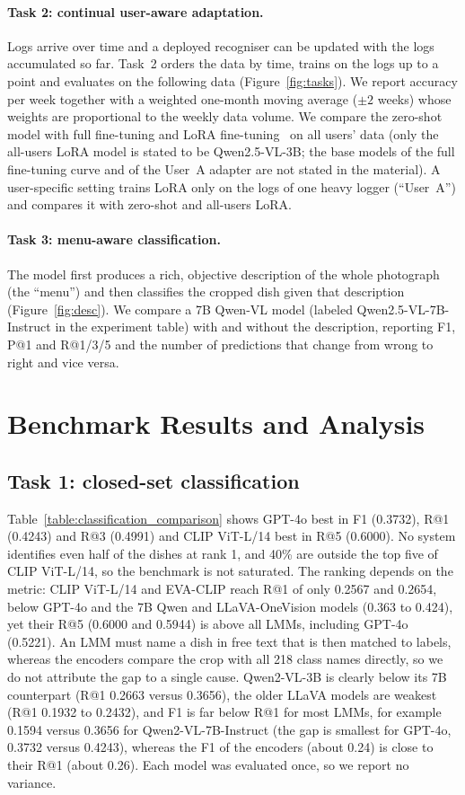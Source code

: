 \documentclass[sigconf, nonacm]{acmart}
\begin{document}
\paragraph{Task 2: continual user-aware adaptation.}
Logs arrive over time and a deployed recogniser can be updated with the logs accumulated so far. Task~2 orders the data by time, trains on the logs up to a point and evaluates on the following data (Figure~\ref{fig:tasks}). We report accuracy per week together with a weighted one-month moving average ($\pm2$ weeks) whose weights are proportional to the weekly data volume. We compare the zero-shot model with full fine-tuning and LoRA fine-tuning~\cite{hu2022lora} on all users' data (only the all-users LoRA model is stated to be Qwen2.5-VL-3B; the base models of the full fine-tuning curve and of the User~A adapter are not stated in the material). A user-specific setting trains LoRA only on the logs of one heavy logger (``User~A'') and compares it with zero-shot and all-users LoRA.

\paragraph{Task 3: menu-aware classification.}
The model first produces a rich, objective description of the whole photograph (the ``menu'') and then classifies the cropped dish given that description (Figure~\ref{fig:desc}). We compare a 7B Qwen-VL model (labeled Qwen2.5-VL-7B-Instruct in the experiment table) with and without the description, reporting F1, P@1 and R@1/3/5 and the number of predictions that change from wrong to right and vice versa.

\section{Benchmark Results and Analysis}
\subsection{Task 1: closed-set classification}

Table~\ref{table:classification_comparison} shows GPT-4o best in F1 (0.3732), R@1 (0.4243) and R@3 (0.4991) and CLIP ViT-L/14 best in R@5 (0.6000). No system identifies even half of the dishes at rank 1, and 40\% are outside the top five of CLIP ViT-L/14, so the benchmark is not saturated. The ranking depends on the metric: CLIP ViT-L/14 and EVA-CLIP reach R@1 of only 0.2567 and 0.2654, below GPT-4o and the 7B Qwen and LLaVA-OneVision models (0.363 to 0.424), yet their R@5 (0.6000 and 0.5944) is above all LMMs, including GPT-4o (0.5221). An LMM must name a dish in free text that is then matched to labels, whereas the encoders compare the crop with all 218 class names directly, so we do not attribute the gap to a single cause. Qwen2-VL-3B is clearly below its 7B counterpart (R@1 0.2663 versus 0.3656), the older LLaVA models are weakest (R@1 0.1932 to 0.2432), and F1 is far below R@1 for most LMMs, for example 0.1594 versus 0.3656 for Qwen2-VL-7B-Instruct (the gap is smallest for GPT-4o, 0.3732 versus 0.4243), whereas the F1 of the encoders (about 0.24) is close to their R@1 (about 0.26). Each model was evaluated once, so we report no variance.
\end{document}
